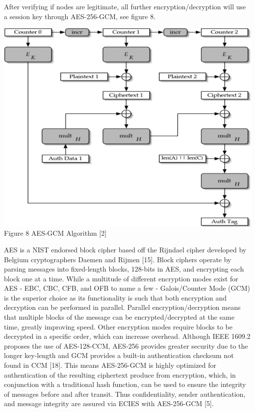 \documentclass[conference,compsoc]{IEEEtran}
\begin{document}
After verifying if nodes are legitimate, all further encryption/decryption will use a session key through AES-256-GCM, see figure 8.
\begin{center}
\includegraphics[scale = .55]{aes.png}
\small {Figure 8 AES-GCM Algorithm [2]}
\break
\end{center}
AES is a NIST endorsed block cipher based off the Rijndael cipher developed by Belgium cryptographers Daemen and Rijmen [15]. Block ciphers operate by parsing messages into fixed-length blocks, 128-bits in AES, and encrypting each block one at a time. While a multitude of different encryption modes exist for AES - EBC, CBC, CFB, and OFB to name a few - Galois/Counter Mode (GCM) is the superior choice as its functionality is such that both encryption and decryption can be performed in parallel. Parallel encryption/decryption means that multiple blocks of the message can be encrypted/decrypted at the same time, greatly improving speed. Other encryption modes require blocks to be decrypted in a specific order, which can increase overhead. Although IEEE 1609.2 proposes the use of AES-128-CCM, AES-256 provides greater security due to the longer key-length and GCM provides a built-in authentication checksum not found in CCM [18]. This means AES-256-GCM is highly optimized for authentication of the resulting ciphertext produce from encryption, which, in conjunction with a traditional hash function, can be used to ensure the integrity of messages before and after transit. Thus confidentiality, sender authentication, and message integrity are assured via ECIES with AES-256-GCM [5].
\end{document}

